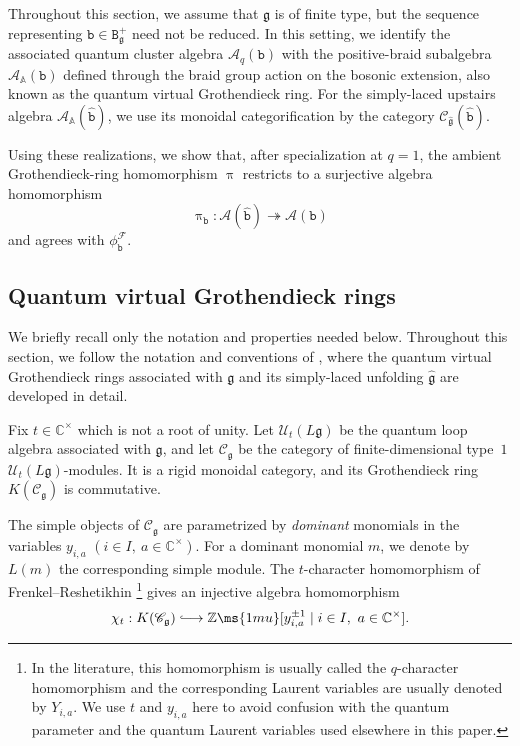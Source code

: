 \documentclass[12pt, leqno]{amsart}
\numberwithin{equation}{section}
\theoremstyle{plain}
\theoremstyle{definition}
\newcommand{\g}{\mathfrak{g}}
\newcommand{\C}{\mathbb{C}}
\newcommand{\Z}{\mathbb{Z}\ms{1mu}}
\newcommand{\hg}{{\widehat{\g}}}
\newcommand{\bbA}{\mathbb{A}}
\newcommand{\calA}{\mathcal{A}}
\newcommand{\calF}{\mathcal{F}}
\newcommand{\calU}{\mathcal{U}}
\newcommand{\scrA}{\mathscr{A}}
\newcommand{\scrC}{\mathscr{C}}
\newcommand{\ttB}{\mathtt{B}}
\newcommand{\ttb}{\mathtt{b}}
\newcommand{\httb}{\widehat{\ttb}}
\begin{document}
Throughout this section, we assume that $\g$ is of finite type, but
the sequence representing $\ttb\in\ttB_\g^+$ need not be reduced.
In this setting, we identify the associated quantum cluster algebra
$\calA_q(\ttb)$ with the positive-braid subalgebra
$\scrA_{\bbA}(\ttb)$ defined through the braid group action on the
bosonic extension, also known as the quantum virtual Grothendieck
ring.  For the simply-laced upstairs algebra
$\scrA_{\bbA}(\httb)$, we use its monoidal categorification by the
category $\scrC_\hg(\httb)$.

Using these realizations, we show that, after specialization at
$q=1$, the ambient Grothendieck-ring homomorphism $\uppi$ restricts
to a surjective algebra homomorphism
\[
\uppi_\ttb: \calA(\httb)\twoheadrightarrow\calA(\ttb)
\]
and agrees with $\phi^\calF_\ttb$.

\subsection{Quantum virtual Grothendieck rings}

We briefly recall only the notation and properties needed below.
Throughout this section, we follow the notation and conventions of
\cite{FHOO,JLO1,JLO2,Qin24B}, where the quantum virtual Grothendieck
rings associated with $\g$ and its simply-laced unfolding $\hg$ are
developed in detail.

\smallskip

Fix $t\in\C^\times$ which is not a root of unity.
Let $\calU_t(L\g)$ be the quantum loop algebra associated with $\g$,
and let $\scrC_\g$ be the category of finite-dimensional type~$1$
$\calU_t(L\g)$-modules.  It is a rigid monoidal category, and its
Grothendieck ring $K(\scrC_\g)$ is commutative.

The simple objects of $\scrC_\g$ are parametrized by \emph{dominant}
monomials in the variables $y_{i,a}$ $(i\in I,\ a\in\C^\times)$.
For a dominant monomial $m$, we denote by $L(m)$ the corresponding
simple module.  The $t$-character homomorphism of
Frenkel--Reshetikhin \cite{CP95,FR98,FR99}
\footnote{In the literature, this homomorphism is usually called the
$q$-character homomorphism and the corresponding Laurent variables
are usually denoted by $Y_{i,a}$.  We use $t$ and $y_{i,a}$ here to
avoid confusion with the quantum parameter and the quantum Laurent
variables used elsewhere in this paper.}
gives an injective algebra homomorphism
\[
\chi_t: K(\scrC_\g) \lhook\joinrel\longrightarrow \Z[y_{i,a}^{\pm1}\mid i\in I,\ a\in\C^\times].
\]
\end{document}
